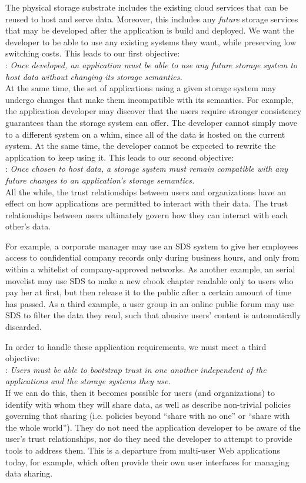 The physical storage substrate includes the existing cloud services that can be
reused to host and serve data.  Moreover, this includes any \emph{future}
storage services that may be developed after the application is build and
deployed.  We want the developer to be able to use any existing systems
they want, while preserving low switching costs.  This leads to our first
objective:
\\
: \emph{Once developed, an application must be able to use any future storage
system to host data without changing its storage semantics.}
\\
At the same time, the set of applications using a given storage system may
undergo changes that make them incompatible with its semantics.  For example,
the application developer may discover that the users require stronger
consistency guarantees than the storage system can offer.  The developer cannot
simply move to a different system on a whim, since all of the data is hosted 
on the current system.  At the same time, the developer cannot be expected
to rewrite the application to keep using it.  This leads to our second
objective:
\\
: \emph{Once chosen to host data, a storage system must remain compatible with any
future changes to an application's storage semantics.}
\\
All the while, the trust relationships between users and organizations have
an effect on how applications are permitted to interact with their data.
The trust relationships between users ultimately govern how they can interact
with each other's data.

For example, a corporate manager may use an SDS system to give her employees access
to confidential company records only during business hours, and only from 
within a whitelist of company-approved networks.
As another example, an serial movelist may use SDS to
make a new ebook chapter readable only to users who pay her at first, but then release it
to the public after a certain amount of time has passed.  As a third example,
a user group in an online public forum may use SDS to filter the data they read,
such that abusive users' content is automatically discarded.

In order to handle these application requirements, we must meet a third
objective:
\\
: \emph{Users must be able to bootstrap trust in one another independent of the
applications and the storage systems they use.}
\\
If we can do this, then it becomes possible for users (and organizations) to
identify with whom they will share data, as well as describe non-trivial
policies governing that sharing (i.e. policies beyond ``share with no one'' or ``share
with the whole world'').  They do not need the application developer to be aware
of the user's trust relationships, nor do they need the developer to attempt to
provide tools to address them.  This is a departure from multi-user Web
applications today, for example, which often provide their own user interfaces
for managing data sharing.

